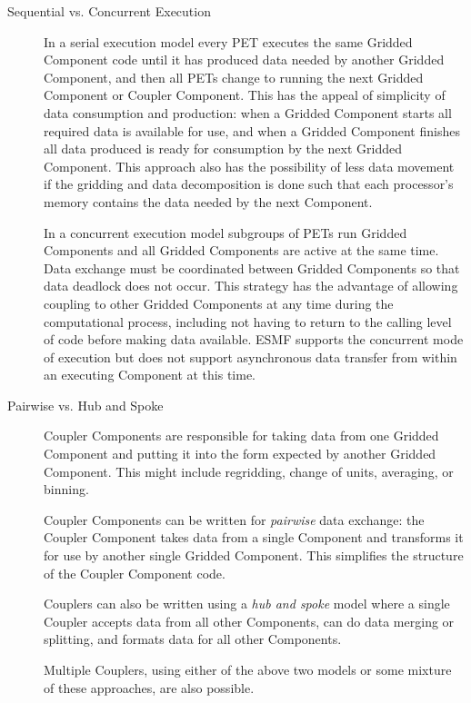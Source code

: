 \begin{description}

\item[Sequential vs. Concurrent Execution]

In a serial execution model every PET executes the same Gridded 
Component code until it has produced data needed by another 
Gridded Component, and then all PETs change to running the next 
Gridded Component or Coupler Component.  This has the appeal of 
simplicity of data consumption and production: when a Gridded 
Component starts all required data is available for use, and when 
a Gridded Component finishes all data produced is ready for consumption 
by the next Gridded Component.  This approach also has
the possibility of less data movement if the gridding and
data decomposition is done such that each processor's memory contains
the data needed by the next Component.

In a concurrent execution model subgroups of PETs run
Gridded Components and all Gridded Components are active at the 
same time.  Data exchange must be coordinated between Gridded 
Components so that data deadlock does not occur.  This strategy 
has the advantage of allowing coupling to other Gridded Components 
at any time during the computational process, including not 
having to return to the calling level of code before making 
data available.  ESMF supports the concurrent mode of execution
but does not support asynchronous data transfer from within an 
executing Component at this time.

\item[Pairwise vs. Hub and Spoke]

Coupler Components are responsible for taking data from one
Gridded Component and putting it into the form expected by another 
Gridded Component.  This might include regridding, change of units, 
averaging, or binning.

Coupler Components can be written for {\it pairwise} data exchange: 
the Coupler Component takes data from a single Component and transforms 
it for use by another single Gridded Component.  This simplifies the 
structure of the Coupler Component code.

Couplers can also be written using a {\it hub and spoke} model where a
single Coupler accepts data from all other Components, can do data
merging or splitting, and formats data for all other Components.

Multiple Couplers, using either of the above two models or some mixture of
these approaches, are also possible.


\end{description}
